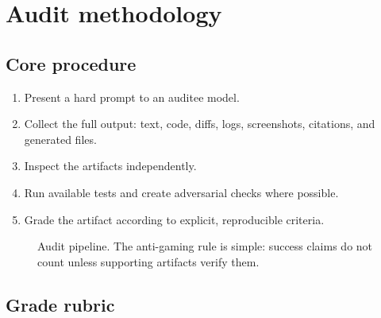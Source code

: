 \documentclass[11pt]{article}
\begin{document}
\section{Audit methodology}

\subsection{Core procedure}

\begin{enumerate}[leftmargin=*]
    \item Present a hard prompt to an auditee model.
    \item Collect the full output: text, code, diffs, logs, screenshots, citations, and generated files.
    \item Inspect the artifacts independently.
    \item Run available tests and create adversarial checks where possible.
    \item Grade the artifact according to explicit, reproducible criteria.
\end{enumerate}

\begin{figure}[ht]
\centering
{}
\caption[Audit pipeline]{Audit pipeline. The anti-gaming rule is simple: success claims do not count unless supporting artifacts verify them.}
\end{figure}

\subsection{Grade rubric}
\end{document}
